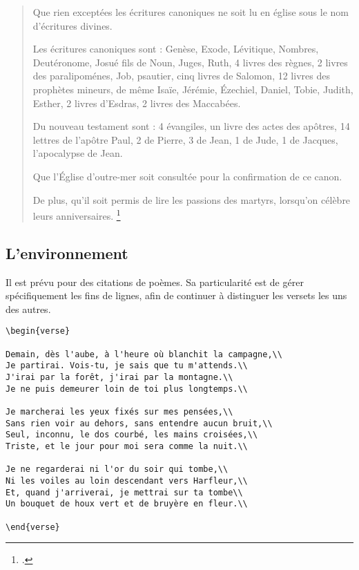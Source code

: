 	\begin{quotation}
Que rien exceptées les écritures canoniques ne soit lu en église sous le nom d’écritures divines.

Les écritures canoniques sont : Genèse, Exode, Lévitique, Nombres, Deutéronome, Josué fils de Noun, Juges, Ruth, 4 livres des règnes, 2 livres des paralipoménes, Job, psautier, cinq livres de Salomon, 12 livres des prophètes mineurs, de même Isaïe, Jérémie, Ézechiel, Daniel, Tobie, Judith, Esther, 2 livres d’Esdras, 2 livres des Maccabées.

Du nouveau testament sont : 4 évangiles, un livre des actes des apôtres, 14 lettres de l’apôtre Paul, 2 de Pierre, 3 de Jean, 1 de Jude, 1 de Jacques, l’apocalypse de Jean.

Que l’Église d'outre-mer soit consultée pour la confirmation de ce canon.

De plus, qu'il soit permis de lire les passions des martyrs, lorsqu'on célèbre leurs anniversaires.
\footcite{BreveHippone}
	\end{quotation}

\subsection{L'environnement }

Il est prévu pour des citations de poèmes. Sa particularité est de gérer spécifiquement les fins de lignes, afin de continuer à distinguer les versets les uns des autres.

\begin{verbatim}
\begin{verse}

Demain, dès l'aube, à l'heure où blanchit la campagne,\\
Je partirai. Vois-tu, je sais que tu m'attends.\\
J'irai par la forêt, j'irai par la montagne.\\
Je ne puis demeurer loin de toi plus longtemps.\\

Je marcherai les yeux fixés sur mes pensées,\\
Sans rien voir au dehors, sans entendre aucun bruit,\\
Seul, inconnu, le dos courbé, les mains croisées,\\
Triste, et le jour pour moi sera comme la nuit.\\

Je ne regarderai ni l'or du soir qui tombe,\\
Ni les voiles au loin descendant vers Harfleur,\\
Et, quand j'arriverai, je mettrai sur ta tombe\\
Un bouquet de houx vert et de bruyère en fleur.\\

\end{verse}
\end{verbatim}

